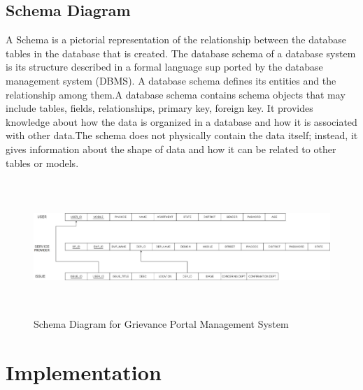 \documentclass[12pt,a4paper]{report}
\begin{document}
\section{Schema Diagram}
A Schema is a pictorial representation of the relationship between the database tables in the database that is created. The database schema of a database system is its structure described in a formal language sup ported by the database management system (DBMS). A database schema defines its entities and the relationship among them.A database schema contains schema objects that may include tables, fields, relationships, primary key, foreign key. It provides knowledge about how the data is organized in a database and how it is associated with other data.The schema does not physically contain the data itself; instead, it gives information about the shape of data and how it can be related to other tables or models.
\begin{figure}[hbtp]
\centering
\includegraphics[width=6.5in,height=2in]{godzi.jpg}
\caption{Schema Diagram for Grievance Portal Management System}
\end{figure}
\chapter{Implementation}
\end{document}
